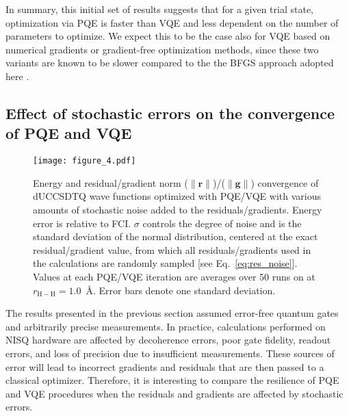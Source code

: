 \documentclass[aps,prx, reprint]{revtex4-2}
\providecommand{\normnorm}[1]{\lVert#1\rVert}
\begin{document}
In summary, this initial set of results suggests that for a given trial state, optimization via PQE is faster than VQE and less dependent on the number of parameters to optimize.
We expect this to be the case also for VQE based on numerical gradients or gradient-free optimization methods, since these two variants are known to be slower compared to the the BFGS approach adopted here \cite{Romero:2019hk}.

\subsection{Effect of stochastic errors on the convergence of PQE and VQE}

\begin{figure*}[ht!]
\centering
\texttt{[image: figure\_4.pdf]}
\caption{Energy and residual/gradient norm ($\normnorm{\mathbf{r}}$)/($\normnorm{\mathbf{g}}$) convergence of dUCCSDTQ  wave functions optimized with PQE/VQE with various amounts of stochastic noise added to the residuals/gradients. Energy error is relative to FCI.
$\sigma$ controls the degree of noise and is the standard deviation of the normal distribution, centered at the exact residual/gradient value, from which all residuals/gradients used in the calculations are randomly sampled [see Eq.~\eqref{eq:res_noise}]. Values at each PQE/VQE iteration are averages over 50 runs on  at $r_{\mathrm{H-H}} = 1.0$~\AA. Error bars denote one standard deviation.}
\label{fig:H4_w_noise}
\end{figure*}

The results presented in the previous section assumed error-free quantum gates and arbitrarily precise measurements.
In practice, calculations performed on NISQ hardware are affected by decoherence errors, poor gate fidelity, readout errors, and loss of precision due to insufficient measurements.
These sources of error will lead to incorrect gradients and residuals that are then passed to a classical optimizer.
Therefore, it is interesting to compare the resilience of PQE and VQE procedures when the residuals and gradients are affected by stochastic errors.
\end{document}
